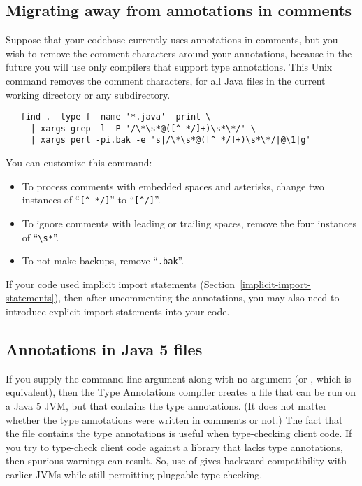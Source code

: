 \subsection{Migrating away from annotations in comments\label{uncommenting-annotations}}

Suppose that your codebase currently uses annotations in comments, but you
wish to remove the comment characters around your annotations, because in
the future you will use only compilers that support type annotations.
This Unix command removes
the comment characters, for all Java files in the current
working directory or any subdirectory.

\begin{Verbatim}
   find . -type f -name '*.java' -print \
     | xargs grep -l -P '/\*\s*@([^ */]+)\s*\*/' \
     | xargs perl -pi.bak -e 's|/\*\s*@([^ */]+)\s*\*/|@\1|g'
\end{Verbatim}

You can customize this command:
\begin{itemize}
\item
To process comments with embedded spaces and asterisks, change
two instances of ``\verb|[^ */]|'' to ``\verb|[^/]|''.
\item
To ignore comments with leading or trailing spaces, remove the four
instances of ``\verb|\s*|''.
\item
  To not make backups, remove ``\verb|.bak|''.
\end{itemize}


If your code used implicit import statements
(Section~\ref{implicit-import-statements}), then after uncommenting the
annotations, you may also need to introduce
explicit import statements into your code.


\subsection{Annotations in Java 5  files\label{java5-class-files}}

If you supply the \code{-target 5} command-line argument along with no
 argument (or , which is equivalent), then the
Type Annotations compiler creates a  file that can be run on a
Java 5 JVM, but that contains the type annotations.  (It does not matter
whether the type annotations were written in comments or not.)  The fact
that the \code{.class} file contains the type annotations is useful when
type-checking client code.  If you try to type-check client code against a
library that lacks type annotations, then spurious warnings can result.
So, use of \code{-target 5} gives backward compatibility with earlier JVMs
while still permitting pluggable type-checking.

